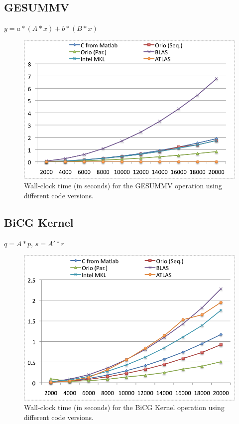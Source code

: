 \documentclass[11pt]{article}
\begin{document}
\subsection{GESUMMV}
$y = a * (A * x) + b * (B * x)$

\begin{figure}[htp]
\centering
\includegraphics[width=.8\textwidth]{figures/gesummv.png}

\caption{Wall-clock time (in seconds) for the GESUMMV operation using different code versions.}
\label{fig:gesummv}
\end{figure}
\subsection{BiCG Kernel}

$q = A * p$, $s = A' * r$

\begin{figure}[htp]
\centering

\includegraphics[width=.8\textwidth]{figures/bicgkernel.png}
\caption{Wall-clock time (in seconds) for the BiCG Kernel operation using different code versions.}
\label{fig:bicgkernel}
\end{figure}
\end{document}
